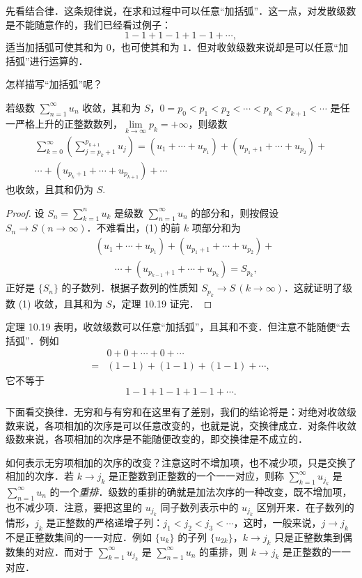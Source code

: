 先看结合律．这条规律说，在求和过程中可以任意``加括弧''．这一点，对发散级数是不能随意作的，我们已经看过例子：
\[
1-1+1-1+1-1+\cdots,
\]
适当加括弧可使其和为 $0$，也可使其和为 $1$．但对收敛级数来说却是可以任意``加括弧''进行运算的．

怎样描写``加括弧''呢？

\begin{theorem}\label{thm:10-19}
若级数 $\displaystyle\sum_{n=1}^{\infty}u_{n}$ 收敛，其和为 $S$，$0=p_{0}<p_{1}<p_{2}<\cdots<p_{k}<p_{k+1}<\cdots$ 是任一严格上升的正整数数列，$\lim\limits_{k\to\infty}p_{k}=+\infty$，则级数
\begin{equation}
\begin{aligned}
\sum_{k=0}^{\infty}\left(\sum_{j=p_{k}+1}^{p_{k+1}}u_{j}\right)
=\left(u_{1}+\cdots+u_{p_{1}}\right)+\left(u_{p_{1}+1}+\cdots+u_{p_{2}}\right)+\\
\cdots+\left(u_{p_{k}+1}+\cdots+u_{p_{k+1}}\right)+\cdots
\end{aligned}
\tag{1}
\end{equation}
也收敛，且其和仍为 $S$.
\end{theorem}

\begin{proof}
设 $S_{n}=\sum_{k=1}^{n}u_{k}$ 是级数 $\displaystyle\sum_{n=1}^{\infty}u_{n}$ 的部分和，则按假设 $S_{n}\to S\,(n\to\infty)$．不难看出，(1) 的前 $k$ 项部分和为
\[
\begin{aligned}
&\left(u_{1}+\cdots+u_{p_{1}}\right)+\left(u_{p_{1}+1}+\cdots+u_{p_{2}}\right)+\\
&\qquad\cdots+\left(u_{p_{k-1}+1}+\cdots+u_{p_{k}}\right)=S_{p_{k}},
\end{aligned}
\]
正好是 $\{S_{n}\}$ 的子数列．根据子数列的性质知 $S_{p_{k}}\to S\,(k\to\infty)$．这就证明了级数 (1) 收敛，且其和为 $S$，定理 10.19 证完．
\end{proof}

定理 10.19 表明，收敛级数可以任意``加括弧''，且其和不变．但注意不能随便``去括弧''．例如
\[
\begin{aligned}
&0+0+\cdots+0+\cdots\\
={}&\left(1-1\right)+\left(1-1\right)+\left(1-1\right)+\cdots,
\end{aligned}
\]
它不等于
\[
1-1+1-1+1-1+\cdots.
\]

下面看交换律．无穷和与有穷和在这里有了差别，我们的结论将是：对绝对收敛级数来说，各项相加的次序是可以任意改变的，也就是说，交换律成立．对条件收敛级数来说，各项相加的次序是不能随便改变的，即交换律是不成立的．

如何表示无穷项相加的次序的改变？注意这时不增加项，也不减少项，只是交换了相加的次序．若 $k\to j_{k}$ 是正整数到正整数的一个一一对应，则称 $\displaystyle\sum_{k=1}^{\infty}u_{j_{k}}$ 是 $\sum_{n=1}^{\infty}u_{n}$ 的一个\emph{重排}．级数的重排的确就是加法次序的一种改变，既不增加项，也不减少项．注意，要把这里的 $u_{j_{k}}$ 同子数列表示中的 $u_{j_{k}}$ 区别开来．在子数列的情形，$j_{k}$ 是正整数的严格递增子列：$j_{1}<j_{2}<j_{3}<\cdots$，这时，一般来说，$j\to j_{k}$ 不是正整数集间的一一对应．例如 $\{u_{k}\}$ 的子列 $\{u_{2k}\}$，$k\to j_{k}$ 只是正整数集到偶数集的对应．而对于 $\sum_{k=1}^{\infty}u_{j_{k}}$ 是 $\sum_{n=1}^{\infty}u_{n}$ 的重排，则 $k\to j_{k}$ 是正整数的一一对应．

